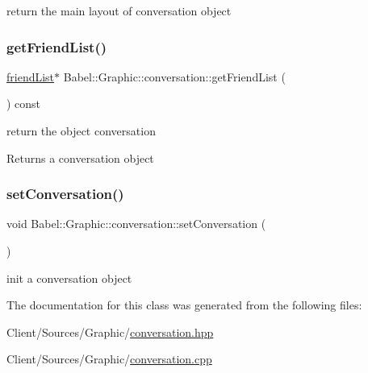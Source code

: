 return the main layout of conversation object \mbox{\label{classBabel_1_1Graphic_1_1conversation_a4be86273e32c40d5f4b7a121d5103f44}} 
\subsubsection{\texorpdfstring{get\+Friend\+List()}{getFriendList()}}
{\footnotesize\ttfamily \hyperlink{classBabel_1_1Graphic_1_1friendList}{friend\+List}$\ast$ Babel\+::\+Graphic\+::conversation\+::get\+Friend\+List (\begin{DoxyParamCaption}{ }\end{DoxyParamCaption}) const\hspace{0.3cm}{\ttfamily [inline]}}

return the object conversation \begin{DoxyReturn}{Returns}
a conversation object 
\end{DoxyReturn}
\mbox{\label{classBabel_1_1Graphic_1_1conversation_aa3bed4252d66d19b2f6d5d328c91ba68}} 
\subsubsection{\texorpdfstring{set\+Conversation()}{setConversation()}}
{\footnotesize\ttfamily void Babel\+::\+Graphic\+::conversation\+::set\+Conversation (\begin{DoxyParamCaption}{ }\end{DoxyParamCaption})}

init a conversation object 

The documentation for this class was generated from the following files\+:\begin{DoxyCompactItemize}
\item 
Client/\+Sources/\+Graphic/\hyperlink{conversation_8hpp}{conversation.\+hpp}\item 
Client/\+Sources/\+Graphic/\hyperlink{conversation_8cpp}{conversation.\+cpp}\end{DoxyCompactItemize}

